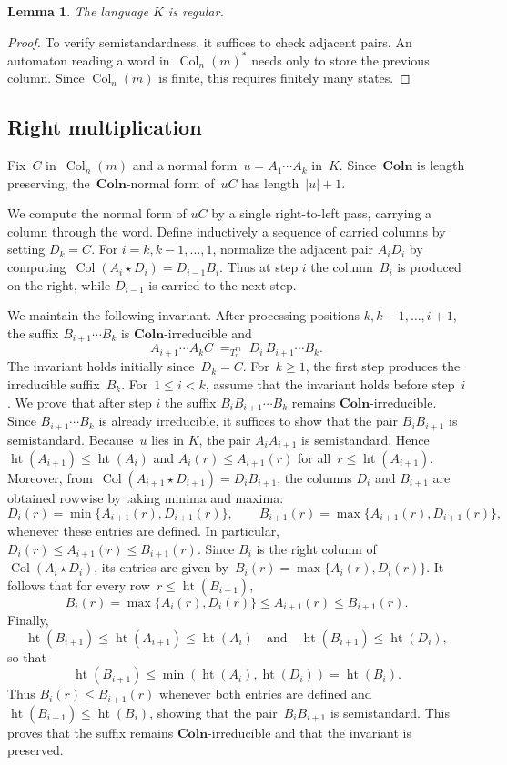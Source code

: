 \documentclass[a4paper, twoside, 11pt, english]{article}
\theoremstyle{plain}
\newtheorem{lemma}[subsubsection]{Lemma}
\theoremstyle{definition}
\DeclareMathOperator{\col}{Col}
\DeclareMathOperator{\height}{ht}
\newcommand{\Colo}{\mathbf{Coln}}
\begin{document}
\begin{lemma}
The language $K$ is regular.
\end{lemma}

\begin{proof}
To verify semistandardness, it suffices to check adjacent pairs.
An automaton reading a word in~$\col_n(m)^*$ needs only to store the
previous column.
Since $\col_n(m)$ is finite, this requires finitely many states.
\end{proof}


\subsection{Right multiplication}

Fix~$C$ in~$\col_n(m)$ and a normal form~$u=A_1\cdots A_k$ in~$K$.
Since~$\Colo$ is length preserving, the~$\Colo$-normal form of~$uC$ has
length~$|u|+1$.

We compute the normal form of $uC$ by a single right-to-left pass,
carrying a column through the word.
Define inductively a sequence of carried columns by setting $D_k=C$.
For $i=k,k-1,\dots,1$, normalize the adjacent pair $A_iD_i$ by computing~$\col(A_i\star D_i)=D_{i-1}B_i$.
Thus at step $i$ the column~$B_i$ is produced on the right, while
$D_{i-1}$ is carried to the next step.

We maintain the following invariant.
After processing positions $k,k-1,\dots,i+1$, the suffix
$B_{i+1}\cdots B_k$ is $\Colo$-irreducible and
\[
A_{i+1}\cdots A_k C \; =_{T_n^m}\; D_i\,B_{i+1}\cdots B_k.
\]
The invariant holds initially since~$D_k=C$.
For~$k\ge1$, the first step produces the irreducible suffix~$B_k$.
For~$1\le i<k$, assume that the invariant holds before step~$i$.
We prove that after step $i$ the suffix
$B_iB_{i+1}\cdots B_k$ remains $\Colo$-irreducible.
Since $B_{i+1}\cdots B_k$ is already irreducible, it suffices to show
that the pair $B_iB_{i+1}$ is semistandard.
Because~$u$ lies in $K$, the pair $A_iA_{i+1}$ is semistandard.
Hence $\height(A_{i+1})\le \height(A_i)$ and
$A_i(r)\le A_{i+1}(r)$ for all~$r\le \height(A_{i+1})$.
Moreover, from~$\col(A_{i+1}\star D_{i+1})=D_iB_{i+1}$,
the columns $D_i$ and $B_{i+1}$ are obtained rowwise by taking minima
and maxima:
\[
D_i(r)=\min\{A_{i+1}(r),D_{i+1}(r)\},
\qquad
B_{i+1}(r)=\max\{A_{i+1}(r),D_{i+1}(r)\},
\]
whenever these entries are defined.
In particular,~$D_i(r)\le A_{i+1}(r)\le B_{i+1}(r)$.
Since $B_i$ is the right column of $\col(A_i\star D_i)$, its entries are
given by~$B_i(r)=\max\{A_i(r),D_i(r)\}$.
It follows that for every row~$r\le \height(B_{i+1})$,
\[
B_i(r)=\max\{A_i(r),D_i(r)\}\le A_{i+1}(r)\le B_{i+1}(r).
\]
Finally,
\[
\height(B_{i+1})
\le \height(A_{i+1})
\le \height(A_i)
\quad\text{and}\quad
\height(B_{i+1})\le \height(D_i),
\]
so that
\[
\height(B_{i+1})
\le \min(\height(A_i),\height(D_i))
= \height(B_i).
\]
Thus $B_i(r)\le B_{i+1}(r)$ whenever both entries are defined and
$\height(B_{i+1})\le \height(B_i)$, showing that the pair~$B_iB_{i+1}$
is semistandard.
This proves that the suffix remains $\Colo$-irreducible and that the
invariant is preserved.
\end{document}
